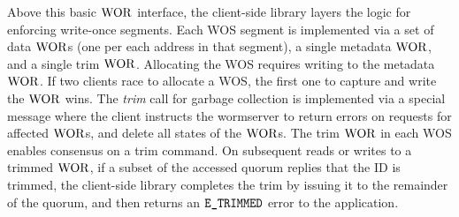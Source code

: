 Above this basic $\mathrm{WOR}$ interface, the client-side library layers the logic for enforcing write-once segments. Each WOS segment is implemented via a set of data $\mathrm{WOR}$s (one per each address in that segment), a single metadata $\mathrm{WOR}$, and a single trim $\mathrm{WOR}$. Allocating the WOS requires writing to the metadata $\mathrm{WOR}$. If two clients race to allocate a WOS, the first one to capture and write the $\mathrm{WOR}$ wins.
The \textit{trim} call for garbage collection is implemented via a special message where the client instructs the wormserver to return errors on requests for affected $\mathrm{WOR}$s, and delete all states of the $\mathrm{WOR}$s. The trim $\mathrm{WOR}$ in each WOS enables consensus on a trim command. On subsequent reads or writes to a trimmed $\mathrm{WOR}$, if a subset of the accessed quorum replies that the ID is trimmed, the client-side library completes the trim by issuing it to the remainder of the quorum, and then returns an ${\mathrm{\texttt{E\_TRIMMED}}}$ error to the application.

%
%
%
%

